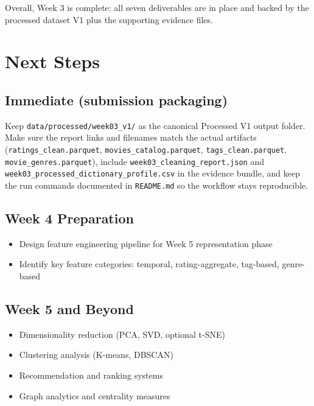 \documentclass[11pt]{article}
\begin{document}
Overall, Week 3 is complete: all seven deliverables are in place and backed by the processed dataset V1 plus the supporting evidence files.

\section{Next Steps}

\subsection{Immediate (submission packaging)}

Keep \texttt{data/processed/week03\_v1/} as the canonical Processed V1 output folder. Make sure the report links and filenames match the actual artifacts (\texttt{ratings\_clean.parquet}, \texttt{movies\_catalog.parquet}, \texttt{tags\_clean.parquet}, \texttt{movie\_genres.parquet}), include \texttt{week03\_cleaning\_report.json} and \texttt{week03\_processed\_dictionary\_profile.csv} in the evidence bundle, and keep the run commands documented in \texttt{README.md} so the workflow stays reproducible.

\subsection{Week 4 Preparation}

\begin{itemize}[leftmargin=1.5em]
    \item Design feature engineering pipeline for Week 5 representation phase
    \item Identify key feature categories: temporal, rating-aggregate, tag-based, genre-based
\end{itemize}

\subsection{Week 5 and Beyond}

\begin{itemize}[leftmargin=1.5em]
    \item Dimensionality reduction (PCA, SVD, optional t-SNE)
    \item Clustering analysis (K-means, DBSCAN)
    \item Recommendation and ranking systems
    \item Graph analytics and centrality measures
\end{itemize}
\end{document}
